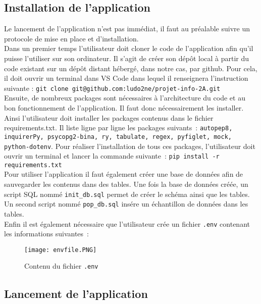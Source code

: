 \documentclass[11pt]{article}
\begin{document}
\subsection{Installation de l'application}
Le lancement de l'application n'est pas immédiat, il faut au préalable suivre un protocole de mise en place et d’installation. \\

Dans un premier temps l’utilisateur doit cloner le code de l’application afin qu’il puisse l’utiliser sur son ordinateur. Il s’agit de créer son dépôt local à partir du code existant sur un dépôt distant hébergé, dans notre cas, par github.
Pour cela, il doit ouvrir un terminal dans VS Code dans lequel il renseignera l’instruction suivante : \texttt{git clone git@github.com:ludo2ne/projet-info-2A.git} \\

Ensuite, de nombreux packages sont nécessaires à l’architecture du code et au bon fonctionnement de l’application. Il faut donc nécessairement les installer. Ainsi l'utilisateur doit installer les packages contenus dans le fichier requirements.txt. Il liste ligne par ligne les packages suivants~: \texttt{autopep8, inquirerPy, psycopg2-bina, ry, tabulate, regex, pyfiglet, mock, python-dotenv}. Pour réaliser l’installation de tous ces packages, l’utilisateur doit ouvrir un terminal et lancer la commande suivante~: \texttt{pip install -r requirements.txt} \\

Pour utiliser l'application il faut également créer une base de données afin de sauvegarder les contenus dans des tables. Une fois la base de données créée, un script SQL nommé \texttt{init\_db.sql} permet de créer le schéma ainsi que les tables. Un second script nommé \texttt{pop\_db.sql} insére un échantillon de données dans les tables. \\

Enfin il est également nécessaire que l'utilisateur crée un fichier \texttt{.env} contenant les informations suivantes~: 

\begin{figure}[h]
\centering
\texttt{[image: envfile.PNG]}
\caption{
Contenu du fichier \texttt{.env}}
\end{figure}



\newpage

\subsection{Lancement de l'application}
\end{document}
